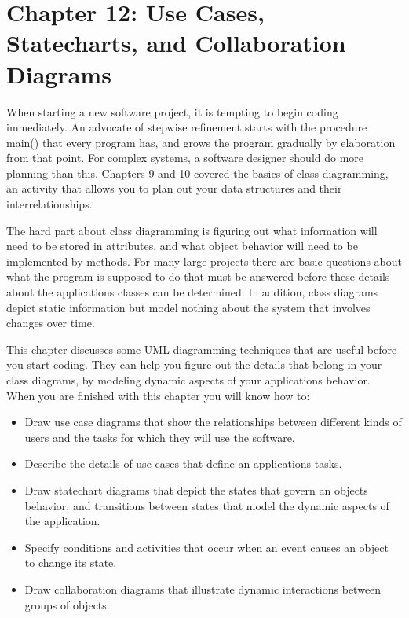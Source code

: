 \clearpage
\section{Chapter 12: Use Cases, Statecharts, and Collaboration Diagrams}

When starting a new software project, it is tempting to begin coding
immediately. An advocate of stepwise refinement starts with the
procedure \textsf{main()} that every program has, and grows the program
gradually by elaboration from that point. For complex systems, a
software designer should do more planning than this. Chapters 9 and 10
covered the basics of class diagramming, an activity that allows you to
plan out your data structures and their interrelationships.

The hard part about class diagramming is figuring out what information
will need to be stored in attributes, and what object behavior will
need to be implemented by methods. For many large projects there are
basic questions about what the program is supposed to do that must be
answered before these details about the application{\textquotesingle}s
classes can be determined. In addition, class diagrams depict static
information but model nothing about the system that involves changes
over time.

This chapter discusses some UML diagramming techniques that are useful
before you start coding. They can help you figure out the details that
belong in your class diagrams, by modeling dynamic aspects of your
application{\textquotesingle}s behavior. When you are finished with
this chapter you will know how to:

\begin{itemize}
\item Draw use case diagrams that show the relationships between
different kinds of users and the tasks for which they will use the
software.
\item Describe the details of use cases that define an
application{\textquotesingle}s tasks.
\item Draw statechart diagrams that depict the states that govern an
object{\textquotesingle}s behavior, and transitions between states that
model the dynamic aspects of the application.
\item Specify conditions and activities that occur when an event causes
an object to change its state.
\item Draw collaboration diagrams that illustrate dynamic interactions
between groups of objects.
\end{itemize}

